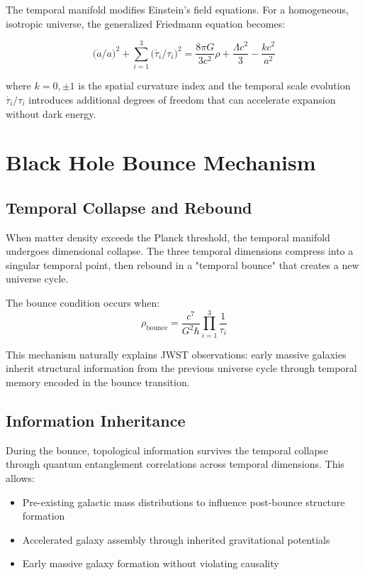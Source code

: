 \documentclass[reprint,amsmath,amssymb,aps,prd,nofootinbib]{revtex4-2}
\begin{document}
The temporal manifold modifies Einstein's field equations. For a homogeneous, isotropic universe, the generalized Friedmann equation becomes:

\begin{equation}
\bigl(\dot{a}/a\bigr)^2 + \sum_{i=1}^{3}\bigl(\dot{\tau_i}/\tau_i\bigr)^2 = \frac{8\pi G}{3c^2}\rho + \frac{\Lambda c^2}{3} - \frac{k c^2}{a^2}
\label{eq:modified_friedmann}
\end{equation}

where $k=0,\pm1$ is the spatial curvature index and the temporal scale evolution $\dot{\tau_i}/\tau_i$ introduces additional degrees of freedom that can accelerate expansion without dark energy.

\section{Black Hole Bounce Mechanism}\label{sec:bounce}

\subsection{Temporal Collapse and Rebound}

When matter density exceeds the Planck threshold, the temporal manifold undergoes dimensional collapse. The three temporal dimensions compress into a singular temporal point, then rebound in a "temporal bounce" that creates a new universe cycle.

The bounce condition occurs when:
\begin{equation}
\rho_{\text{bounce}} = \frac{c^7}{G^2\hbar} \prod_{i=1}^{3}\frac{1}{\tau_i}
\label{eq:bounce_condition}
\end{equation}

This mechanism naturally explains JWST observations: early massive galaxies inherit structural information from the previous universe cycle through temporal memory encoded in the bounce transition.

\subsection{Information Inheritance}

During the bounce, topological information survives the temporal collapse through quantum entanglement correlations across temporal dimensions. This allows:

\begin{itemize}
\item Pre-existing galactic mass distributions to influence post-bounce structure formation
\item Accelerated galaxy assembly through inherited gravitational potentials
\item Early massive galaxy formation without violating causality
\end{itemize}
\end{document}
